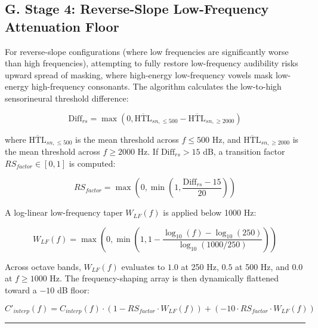 \documentclass[
]{article}
\begin{document}
\subsection{G. Stage 4: Reverse-Slope Low-Frequency Attenuation
Floor}\label{g.-stage-4-reverse-slope-low-frequency-attenuation-floor}

For reverse-slope configurations (where low frequencies are
significantly worse than high frequencies), attempting to fully restore
low-frequency audibility risks upward spread of masking, where
high-energy low-frequency vowels mask low-energy high-frequency
consonants. The algorithm calculates the low-to-high sensorineural
threshold difference:

\begin{equation}
\text{Diff}_{rs} = \max\left(0, \overline{\text{HTL}}_{sn, \le 500} - \overline{\text{HTL}}_{sn, \ge 2000}\right)
\end{equation}

where \(\overline{\text{HTL}}_{sn, \le 500}\) is the mean threshold
across \(f \le 500\) Hz, and \(\overline{\text{HTL}}_{sn, \ge 2000}\) is
the mean threshold across \(f \ge 2000\) Hz. If
\(\text{Diff}_{rs} > 15\) dB, a transition factor
\(RS_{factor} \in [0, 1]\) is computed:

\begin{equation}
RS_{factor} = \max\left(0, \min\left(1, \frac{\text{Diff}_{rs} - 15}{20}\right)\right)
\end{equation}

A log-linear low-frequency taper \(W_{LF}(f)\) is applied below 1000 Hz:

\begin{equation}
W_{LF}(f) = \max\left(0, \min\left(1, 1 - \frac{\log_{10}(f) - \log_{10}(250)}{\log_{10}(1000/250)}\right)\right)
\end{equation}

Across octave bands, \(W_{LF}(f)\) evaluates to \(1.0\) at 250 Hz,
\(0.5\) at 500 Hz, and \(0.0\) at \(f \ge 1000\) Hz. The
frequency-shaping array is then dynamically flattened toward a \(-10\)
dB floor:

\begin{equation}
C'_{interp}(f) = C_{interp}(f) \cdot \left(1 - RS_{factor} \cdot W_{LF}(f)\right) + \left(-10 \cdot RS_{factor} \cdot W_{LF}(f)\right)
\end{equation}

\begin{center}\rule{0.5\linewidth}{0.5pt}\end{center}
\end{document}
